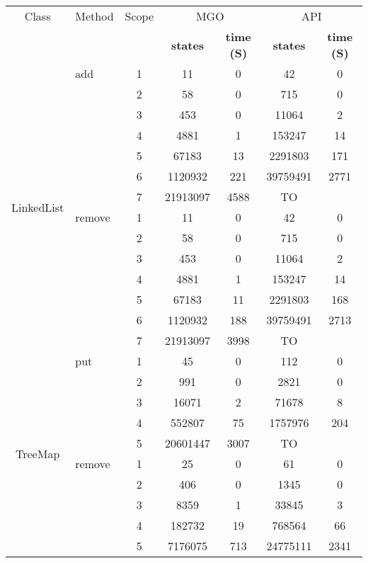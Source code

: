 
\begin{table}
\scriptsize
\begin{tabular}{ c| l| c c c c c}
\hline
Class & Method & Scope &
\multicolumn{2}{c}{\textsf{MGO}} &
\multicolumn{2}{c}{\textsf{API}} \\
&&&
\tiny{\textbf{states}} & \tiny{\textbf{time (S)}} &
\tiny{\textbf{states}} & \tiny{\textbf{time (S)} }\\
\hline
\multirow{14}{*}{LinkedList} 
& add
  & 1 & 11  & 0 & 42  & 0 \\
& & 2 & 58  & 0 & 715 & 0 \\
& & 3 & 453 & 0 & 11064 & 2 \\
& & 4 & 4881  & 1 & 153247  & 14  \\
& & 5 & 67183 & 13  & 2291803 & 171 \\
& & 6 & 1120932 & 221 & 39759491  & 2771  \\
& & 7 & 21913097  & 4588  &TO  & \\

\cline{2-7}
 &remove 
  & 1 & 11  & 0 & 42  & 0 \\
& & 2 & 58  & 0 & 715 & 0 \\
& & 3 & 453 & 0 & 11064 & 2\\
& & 4 & 4881  & 1 & 153247  & 14\\
& & 5 & 67183 & 11  & 2291803 & 168\\
& & 6 & 1120932 & 188 & 39759491  & 2713\\
& & 7 & 21913097  & 3998  & TO \\ 

\hline
\multirow{10}{*}{TreeMap} 
& put
  & 1 & 45  & 0 & 112 & 0 \\
& & 2 & 991 & 0 & 2821  & 0 \\
& & 3 & 16071 & 2 & 71678 & 8 \\
& & 4 & 552807  & 75  & 1757976 & 204 \\
& & 5 & 20601447  & 3007  & TO& \\
\cline{2-7}

& remove
  & 1 & 25  & 0 & 61  & 0 \\
& & 2 & 406 & 0 & 1345  & 0 \\
& & 3 & 8359  & 1 & 33845 & 3 \\
& & 4 & 182732  & 19  & 768564  & 66  \\
& & 5 & 7176075 & 713 & 24775111  & 2341  \\






\end{tabular}
\end{table}
